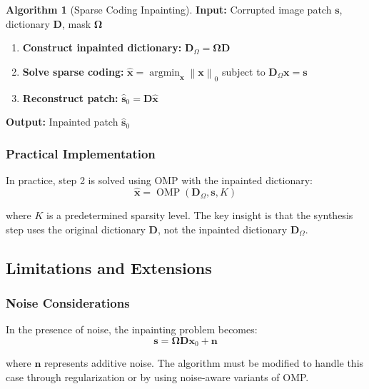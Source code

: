 \documentclass[12pt]{article}
\renewcommand{\vec}[1]{\mathbf{#1}}
\DeclareMathOperator{\argmin}{argmin}
\DeclareMathOperator{\OMP}{OMP}
\newcommand{\zeronorm}[1]{\left\|#1\right\|_0}
\theoremstyle{definition}
\newtheorem{algorithm}[theorem]{Algorithm}
\begin{document}
\begin{algorithm}[Sparse Coding Inpainting]
    \label{alg:inpainting}
    \textbf{Input:} Corrupted image patch $\vec{s}$, dictionary $\mathbf{D}$, mask $\mathbf{\Omega}$
    \begin{enumerate}
        \item \textbf{Construct inpainted dictionary:} $\mathbf{D}_{\Omega} = \mathbf{\Omega} \mathbf{D}$
        \item \textbf{Solve sparse coding:} $\hat{\vec{x}} = \argmin_{\vec{x}} \zeronorm{\vec{x}}$ subject to $\mathbf{D}_{\Omega}\vec{x} = \vec{s}$
        \item \textbf{Reconstruct patch:} $\hat{\vec{s}}_0 = \mathbf{D}\hat{\vec{x}}$
    \end{enumerate}
    \textbf{Output:} Inpainted patch $\hat{\vec{s}}_0$
\end{algorithm}

\subsubsection{Practical Implementation}

In practice, step 2 is solved using OMP with the inpainted dictionary:
\begin{equation}
    \hat{\vec{x}} = \OMP(\mathbf{D}_{\Omega}, \vec{s}, K)
\end{equation}

where $K$ is a predetermined sparsity level. The key insight is that the synthesis step uses the original dictionary $\mathbf{D}$, not the inpainted dictionary $\mathbf{D}_{\Omega}$.

\subsection{Limitations and Extensions}

\subsubsection{Noise Considerations}

In the presence of noise, the inpainting problem becomes:
\begin{equation}
    \vec{s} = \mathbf{\Omega} \mathbf{D} \vec{x}_0 + \vec{n}
\end{equation}

where $\vec{n}$ represents additive noise. The algorithm must be modified to handle this case through regularization or by using noise-aware variants of OMP.
\end{document}
